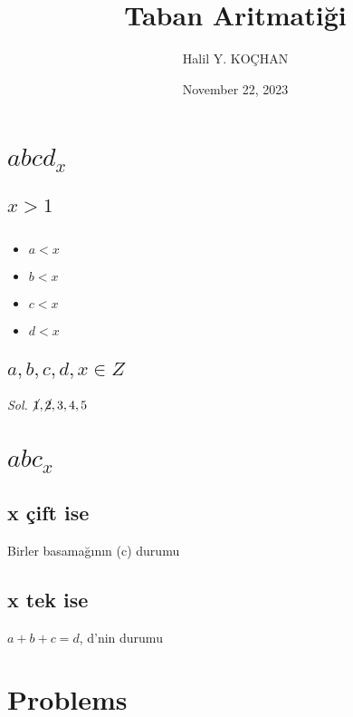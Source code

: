 \documentclass{article}
\title{Taban Aritmatiği}
\author{Halil Y. KOÇHAN}
\date{November 22, 2023}
\theoremstyle{mytheoremstyle}
\theoremstyle{mytheoremstyle}
\theoremstyle{myproblemstyle}
\begin{document}
    \maketitle

\section{$ abcd_x $} %
\subsection{$ x > 1 $}
\subsection{}
\begin{itemize}
  \item $ a < x $
  \item $ b < x $
  \item $ c < x $
  \item $ d < x $
\end{itemize}
\subsection{$ a, b, c, d, x \in {Z} $}

\begin{problem}
\end{problem}

\textit{ Sol. }
$ \cancel{1}, \cancel{2}, 3, 4, 5 $

\section{$ abc_x $}
\subsection{x çift ise}
Birler basamağının (c) durumu
\subsection{x tek ise}
$ a + b + c = d $, d'nin durumu

\section{Problems}
\begin{problem}[$ 1342_6 = ?_{10} $]
\end{problem}
\end{document}
